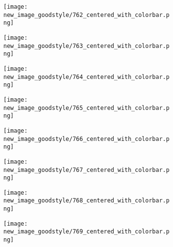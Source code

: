 \documentclass[a4paper,12pt]{article}
\begin{document}
\begin{figure}[H]
  \begin{subfigure}{0.11\textwidth}
    \texttt{[image: new\_image\_goodstyle/762\_centered\_with\_colorbar.png]}
  \end{subfigure}
  \hfill
  \begin{subfigure}{0.11\textwidth}
    \texttt{[image: new\_image\_goodstyle/763\_centered\_with\_colorbar.png]}
  \end{subfigure}
  \hfill
  \begin{subfigure}{0.11\textwidth}
    \texttt{[image: new\_image\_goodstyle/764\_centered\_with\_colorbar.png]}
  \end{subfigure}
  \hfill
  \begin{subfigure}{0.11\textwidth}
    \texttt{[image: new\_image\_goodstyle/765\_centered\_with\_colorbar.png]}
  \end{subfigure}
  \hfill
  \begin{subfigure}{0.11\textwidth}
    \texttt{[image: new\_image\_goodstyle/766\_centered\_with\_colorbar.png]}
  \end{subfigure}
  \hfill
  \begin{subfigure}{0.11\textwidth}
    \texttt{[image: new\_image\_goodstyle/767\_centered\_with\_colorbar.png]}
  \end{subfigure}
  \hfill
  \begin{subfigure}{0.11\textwidth}
    \texttt{[image: new\_image\_goodstyle/768\_centered\_with\_colorbar.png]}
  \end{subfigure}
  \hfill
  \begin{subfigure}{0.11\textwidth}
    \texttt{[image: new\_image\_goodstyle/769\_centered\_with\_colorbar.png]}
  \end{subfigure}
  \hfill
\end{figure}
\end{document}
